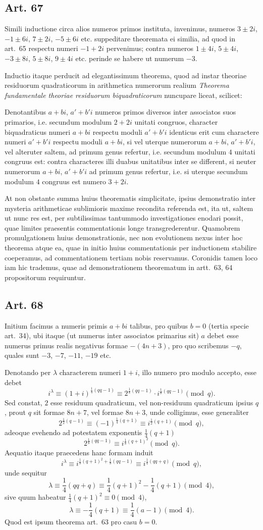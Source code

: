 \documentclass[12pt]{article}
\newcommand{\art}[1]{\subsection*{Art. #1}}
\begin{document}
\art{67}
Simili inductione circa alios numeros primos instituta, invenimus, numeros $3\pm2i$, $-1\pm6i$, $7\pm2i$, $-5\pm6i$ etc. suppeditare theoremata ei similia, ad quod in art.~65 respectu numeri $-1+2i$ pervenimus; contra numeros $1\pm4i$, $5\pm4i$, $-3\pm8i$, $5\pm8i$, $9\pm4i$ etc. perinde se habere ut numerum $-3$.

Inductio itaque perducit ad elegantissimum theorema, quod ad instar theoriae residuorum quadraticorum in arithmetica numerorum realium \textit{Theorema fundamentale theoriae residuorum biquadraticorum} nuncupare liceat, scilicet:

Denotantibus $a+bi$, $a'+b'i$ numeros primos diversos inter associatos suos primarios, i.e. secundum modulum $2+2i$ unitati congruos, character biquadraticus numeri $a+bi$ respectu moduli $a'+b'i$ identicus erit cum charactere numeri $a'+b'i$ respectu moduli $a+bi$, si vel uterque numerorum $a+bi$, $a'+b'i$, vel alteruter saltem, ad primum genus refertur, i.e. secundum modulum $4$ unitati congruus est: contra characteres illi duabus unitatibus inter se different, si neuter numerorum $a+bi$, $a'+b'i$ ad primum genus refertur, i.e. si uterque secundum modulum $4$ congruus est numero $3+2i$.

At non obstante summa huius theorematis simplicitate, ipsius demonstratio inter mysteria arithmeticae sublimioris maxime recondita referenda est, ita ut, saltem ut nunc res est, per subtilissimas tantummodo investigationes enodari possit, quae limites praesentis commentationis longe transgrederentur. Quamobrem promulgationem huius demonstrationis, nec non evolutionem nexus inter hoc theorema atque ea, quae in initio huius commentationis per inductionem stabilire coeperamus, ad commentationem tertiam nobis reservamus. Coronidis tamen loco iam hic trademus, quae ad demonstrationem theorematum in artt.~63, 64 propositorum requiruntur.

\art{68}
Initium facimus a numeris primis $a+bi$ talibus, pro quibus $b=0$ (tertia specie art.~34), ubi itaque (ut numerus inter associatos primarius sit) $a$ debet esse numerus primus realis negativus formae $-(4n+3)$, pro quo scribemus $-q$, quales sunt $-3$, $-7$, $-11$, $-19$ etc.

Denotando per $\lambda$ characterem numeri $1+i$, illo numero pro modulo accepto, esse debet
\[
i^\lambda \equiv (1+i)^{\frac14(qq-1)}
       \equiv 2^{\frac18(qq-1)}\cdot i^{\frac18(qq-1)}
       \pmod q.
\]
Sed constat, $2$ esse residuum quadraticum, vel non-residuum quadraticum ipsius $q$, prout $q$ sit formae $8n+7$, vel formae $8n+3$, unde colligimus, esse generaliter
\[
2^{\frac12(q-1)}\equiv (-1)^{\frac14(q+1)}
      \equiv i^{\frac12(q+1)}\pmod q,
\]
adeoque evehendo ad potestatem exponentis $\frac14(q+1)$
\[
2^{\frac18(qq-1)}\equiv i^{\frac18(q+1)^2}\pmod q.
\]
Aequatio itaque praecedens hanc formam induit
\[
i^\lambda\equiv i^{\frac18(q+1)^2+\frac18(qq-1)}
      \equiv i^{\frac14(qq+q)}\pmod q,
\]
unde sequitur
\[
\lambda\equiv \frac14(qq+q)
      \equiv \frac14(q+1)^2-\frac14(q+1)\pmod4,
\]
sive quum habeatur $\frac14(q+1)^2\equiv0\pmod4$,
\[
\lambda\equiv-\frac14(q+1)\equiv\frac14(a-1)\pmod4.
\]
Quod est ipsum theorema art.~63 pro casu $b=0$.
\end{document}
